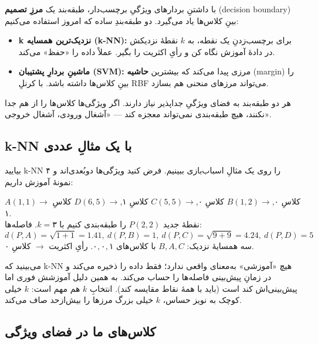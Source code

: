 \documentclass[12pt,a4paper]{article}
\begin{document}
با داشتنِ بردارهای ویژگیِ برچسب‌دار، طبقه‌بند یک \textbf{مرزِ تصمیم} (decision boundary) بینِ کلاس‌ها یاد می‌گیرد. دو طبقه‌بندِ ساده که امروز استفاده می‌کنیم:

\begin{itemize}
  \item \textbf{k نزدیک‌ترین همسایه (k-NN):} برای برچسب‌زدنِ یک نقطه، به $k$ نقطهٔ نزدیکش در دادهٔ آموزش نگاه کن و رأیِ اکثریت را بگیر. عملاً داده را «حفظ» می‌کند.
  \item \textbf{ماشینِ بردارِ پشتیبان (SVM):} مرزی پیدا می‌کند که بیشترین \textbf{حاشیه} (margin) را بینِ کلاس‌ها داشته باشد. با کرنلِ RBF می‌تواند مرزهای منحنی هم بسازد.
\end{itemize}

\begin{nokte}
هر دو طبقه‌بند به فضای ویژگیِ جداپذیر نیاز دارند. اگر ویژگی‌ها کلاس‌ها را از هم جدا نکنند، هیچ طبقه‌بندی نمی‌تواند معجزه کند — «آشغال ورودی، آشغال خروجی».
\end{nokte}

\subsection{k-NN با یک مثالِ عددی}

بیایید k-NN را روی یک مثالِ اسباب‌بازی ببینیم. فرض کنید ویژگی‌ها دوبُعدی‌اند و ۴ نمونهٔ آموزش داریم:

\begin{riyazi}
$A(1,1)\!\to$ کلاسِ ۰,\quad $B(1,2)\!\to$ کلاسِ ۰,\quad $C(5,5)\!\to$ کلاسِ ۱,\quad $D(6,5)\!\to$ کلاسِ ۱.\\[3pt]
نقطهٔ جدید $P(2,2)$ را طبقه‌بندی کنیم با $k=۳$. فاصله‌ها:
\[
d(P,A)=\sqrt{1{+}1}=1.41,\ d(P,B)=1,\ d(P,C)=\sqrt{9{+}9}=4.24,\ d(P,D)=5
\]
سه همسایهٔ نزدیک: $B, A, C$ با کلاس‌های $۰, ۰, ۱$. رأیِ اکثریت $\to$ کلاسِ ۰.
\end{riyazi}

\begin{nokte}
می‌بینید که k-NN هیچ «آموزشی» به‌معنای واقعی ندارد؛ فقط داده را ذخیره می‌کند و در زمانِ پیش‌بینی فاصله‌ها را حساب می‌کند. به همین دلیل آموزشش فوری اما پیش‌بینی‌اش کند است (باید با همهٔ نقاط مقایسه کند). انتخابِ $k$ هم مهم است: $k$ خیلی کوچک به نویز حساس، $k$ خیلی بزرگ مرزها را بیش‌از‌حد صاف می‌کند.
\end{nokte}

\subsection{کلاس‌های ما در فضای ویژگی}
\end{document}
